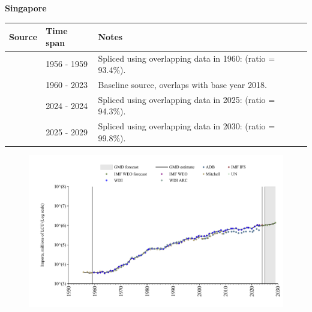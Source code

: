 \documentclass[12pt,a4paper,landscape]{article}
\begin{document}
\begin{adjustbox}{max totalsize={\paperwidth}{\paperheight},center}
\begin{minipage}[t][\textheight][t]{\textwidth}
\vspace*{0.5cm}
{}
\begin{center}
{\Large\bfseries Singapore}
\end{center}
\vspace{0.5cm}
\begin{table}[H]
\centering
\small
\begin{tabular}{|l|l|l|}
\hline
\textbf{Source} & \textbf{Time span} & \textbf{Notes} \\
\hline
\rowcolor{white}\cite{Mitchell}& 1956 - 1959 &Spliced using overlapping data in 1960: (ratio = 93.4\%).\\
\rowcolor{lightgray}\cite{WDI}& 1960 - 2023 &Baseline source, overlaps with base year 2018.\\
\rowcolor{white}\cite{IMF_IFS}& 2024 - 2024 &Spliced using overlapping data in 2025: (ratio = 94.3\%).\\
\rowcolor{lightgray}\cite{IMF_WEO_forecast}& 2025 - 2029 &Spliced using overlapping data in 2030: (ratio = 99.8\%).\\
\hline
\end{tabular}
\end{table}
\begin{figure}[H]
\centering
\includegraphics[width=\textwidth,height=0.6\textheight,keepaspectratio]{graphs/SGP_imports.pdf}
\end{figure}
\end{minipage}
\end{adjustbox}
\end{document}

